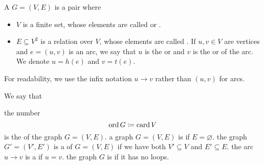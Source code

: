 \begin{definition}\label{def:directed_graph}\cite[1-graphs from chapter 1, section 1.1]{Gondran1984}
  A  \( G = (V, E) \) is a pair where
  \begin{itemize}
    \item \( V \) is a finite set, whose elements are called  or .
    \item \( E \subseteq V^2 \) is a relation over \( V \), whose elements are called . If \( u, v \in V \) are vertices and \( e = (u, v) \) is an arc, we say that \( u \) is the  or  and \( v \) is the  or  of the arc. We denote $u = h(e)$ and $v = t(e)$.
  \end{itemize}

  For readability, we use the infix notation \( u \to v \) rather than \( (u, v) \) for arcs.

  We say that
  \begin{defenum}
     the number
    \begin{equation*}
      \operatorname{ord} G \coloneqq \operatorname{card} V
    \end{equation*}
    is the  of the graph \( G = (V, E) \).
     a graph \( G = (V, E) \) is  if \( E = \varnothing \).
     the graph \( G' = (V', E') \) is a  of \( G = (V, E) \) if we have both \( V' \subseteq V \) and \( E' \subseteq E \).
     the arc \( u \to v \) is a  if \( u = v \).
    \cite[chapter 1, section 1.3]{Gondran1984} the graph \( G \) is  if it has no loops.
  \end{defenum}
\end{definition}

